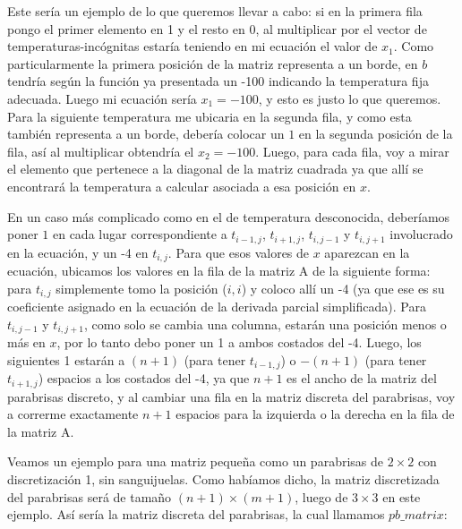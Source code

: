 \vspace{\baselineskip}

Este sería un ejemplo de lo que queremos llevar a cabo: si en la primera fila pongo el primer elemento en 1 y el resto en 0, al multiplicar por el vector de temperaturas-incógnitas estaría teniendo en mi ecuación el valor de $x_1$. Como particularmente la primera posición de la matriz representa a un borde, en $b$ tendría según la función ya presentada un -100 indicando la temperatura fija adecuada. Luego mi ecuación sería $x_1 = -100$, y esto es justo lo que queremos. Para la siguiente temperatura me ubicaria en la segunda fila, y como esta también representa a un borde, debería colocar un $1$ en la segunda posición de la fila, así al multiplicar obtendría el $x_2 = -100$. Luego, para cada fila, voy a mirar el elemento que pertenece a la diagonal de la matriz cuadrada ya que allí se encontrará la temperatura a calcular asociada a esa posición en $x$.

En un caso más complicado como en el de temperatura desconocida, deberíamos poner $1$ en cada lugar correspondiente a $t_{i-1,j}$, $t_{i+1,j}$, $t_{i,j-1}$ y $t_{i,j+1}$ involucrado en la ecuación, y un -4 en $t_{i,j}$. Para que esos valores de $x$ aparezcan en la ecuación, ubicamos los valores en la fila de la matriz A de la siguiente forma: para $t_{i,j}$ simplemente tomo la posición ($i,i$) y coloco allí un -4 (ya que ese es su coeficiente asignado en la ecuación de la derivada parcial simplificada). Para $t_{i,j-1}$ y $t_{i,j+1}$, como solo se cambia una columna, estarán una posición menos o más en $x$, por lo tanto debo poner un 1 a ambos costados del -4. Luego, los siguientes 1 estarán a $(n+1)$ (para tener $t_{i-1,j}$) o $-(n+1)$ (para tener $t_{i+1,j}$) espacios a los costados del -4, ya que $n+1$ es el ancho de la matriz del parabrisas discreto, y al cambiar una fila en la matriz discreta del parabrisas, voy a correrme exactamente $n+1$ espacios para la izquierda o la derecha en la fila de la matriz A.

\vspace{\baselineskip}

Veamos un ejemplo para una matriz pequeña como un parabrisas de $2 \times 2$ con discretización 1, sin sanguijuelas. Como habíamos dicho, la matriz discretizada del parabrisas será de tamaño $(n+1) \times (m+1)$, luego de $3 \times 3$ en este ejemplo. Así sería la matriz discreta del parabrisas, la cual llamamos $pb\_matrix$: 

\vspace{\baselineskip}

